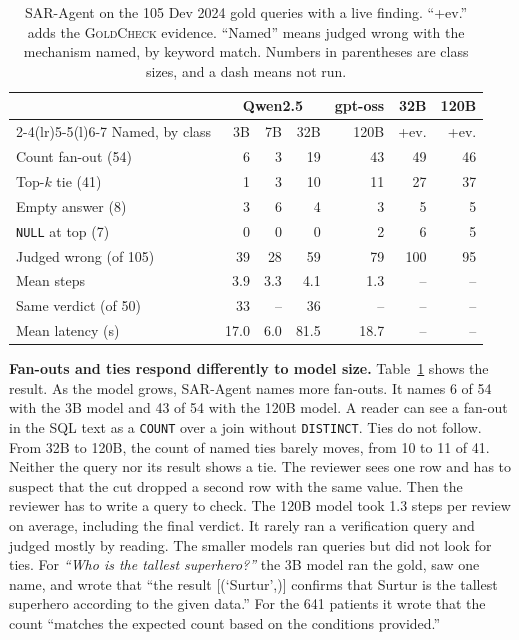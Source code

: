 \documentclass[conference]{IEEEtran}
\newcommand{\sys}{\textsc{GoldCheck}}
\begin{document}
\begin{table}[t]
\caption{SAR-Agent on the 105 Dev 2024 gold queries with a live finding.
``+ev.'' adds the \sys{} evidence. ``Named'' means judged wrong with the mechanism named, by keyword match. Numbers in parentheses are class sizes, and a dash means not run.}
\label{tab:sar}
\centering
\footnotesize
\setlength{\tabcolsep}{2.4pt}
\begin{tabular}{@{}lrrrrrr@{}}
\toprule
 & \multicolumn{3}{c}{Qwen2.5} & gpt-oss & 32B & 120B \\
\cmidrule(lr){2-4}\cmidrule(lr){5-5}\cmidrule(l){6-7}
Named, by class & 3B & 7B & 32B & 120B & +ev. & +ev. \\
\midrule
Count fan-out (54) & 6 & 3 & 19 & 43 & 49 & 46 \\
Top-$k$ tie (41) & 1 & 3 & 10 & 11 & 27 & 37 \\
Empty answer (8) & 3 & 6 & 4 & 3 & 5 & 5 \\
\texttt{NULL} at top (7) & 0 & 0 & 0 & 2 & 6 & 5 \\
\midrule
Judged wrong (of 105) & 39 & 28 & 59 & 79 & 100 & 95 \\
Mean steps & 3.9 & 3.3 & 4.1 & 1.3 & -- & -- \\
Same verdict (of 50) & 33 & -- & 36 & -- & -- & -- \\
Mean latency (s) & 17.0 & 6.0 & 81.5 & 18.7 & -- & -- \\
\bottomrule
\end{tabular}
\end{table}

\textbf{Fan-outs and ties respond differently to model size.}
Table~\ref{tab:sar} shows the result. As the model grows, SAR-Agent names more
fan-outs. It names 6 of 54 with the 3B model and 43 of 54 with the 120B model. A
reader can see a fan-out in the SQL text as a \texttt{COUNT} over a join without
\texttt{DISTINCT}. Ties do not follow. From
32B to 120B, the count of named ties barely moves, from 10 to 11 of 41. Neither
the query nor its result shows a tie. The reviewer sees one row and has to
suspect that the cut dropped a second row with the same value. Then the
reviewer has to write a query to check. The 120B model took 1.3 steps per review
on average, including the final verdict. It rarely ran a verification query and
judged mostly by reading. The smaller models ran queries but did not look for
ties. For \emph{``Who is the tallest superhero?''} the 3B model ran the
gold, saw one name, and wrote that ``the result [(`Surtur',)] confirms that
Surtur is the tallest superhero according to the given data.'' For the 641
patients it wrote that the count ``matches the expected count based on the
conditions provided.''
\end{document}
